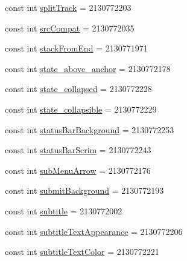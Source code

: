 \begin{DoxyCompactItemize}
\item 
const int \mbox{\hyperlink{class_f_w_p_s___app_1_1_droid_1_1_resource_1_1_attribute_aef4b9b833cbe81f054179859df3474b5}{split\+Track}} = 2130772203
\item 
const int \mbox{\hyperlink{class_f_w_p_s___app_1_1_droid_1_1_resource_1_1_attribute_a4768248c555a18bf40d06fd68fdbc4ea}{src\+Compat}} = 2130772035
\item 
const int \mbox{\hyperlink{class_f_w_p_s___app_1_1_droid_1_1_resource_1_1_attribute_a1e6408834e93d87ab324f1b93d15f7ae}{stack\+From\+End}} = 2130771971
\item 
const int \mbox{\hyperlink{class_f_w_p_s___app_1_1_droid_1_1_resource_1_1_attribute_a1a7566ecd97cb69d430450383849c219}{state\+\_\+above\+\_\+anchor}} = 2130772178
\item 
const int \mbox{\hyperlink{class_f_w_p_s___app_1_1_droid_1_1_resource_1_1_attribute_ac6df4bbbc19e50d5982d909b8423b6c2}{state\+\_\+collapsed}} = 2130772228
\item 
const int \mbox{\hyperlink{class_f_w_p_s___app_1_1_droid_1_1_resource_1_1_attribute_aef1b62a51094dcfe8aa05d500db9d944}{state\+\_\+collapsible}} = 2130772229
\item 
const int \mbox{\hyperlink{class_f_w_p_s___app_1_1_droid_1_1_resource_1_1_attribute_a4f9fce98bb828cea57be718bc0b5d36c}{status\+Bar\+Background}} = 2130772253
\item 
const int \mbox{\hyperlink{class_f_w_p_s___app_1_1_droid_1_1_resource_1_1_attribute_a2853386f4c6bb6add09b933d337f27f8}{status\+Bar\+Scrim}} = 2130772243
\item 
const int \mbox{\hyperlink{class_f_w_p_s___app_1_1_droid_1_1_resource_1_1_attribute_acf3e965098fd8242a628b761c2749a20}{sub\+Menu\+Arrow}} = 2130772176
\item 
const int \mbox{\hyperlink{class_f_w_p_s___app_1_1_droid_1_1_resource_1_1_attribute_a20dd6b19e5b4abe1e9023ca8a07a60ac}{submit\+Background}} = 2130772193
\item 
const int \mbox{\hyperlink{class_f_w_p_s___app_1_1_droid_1_1_resource_1_1_attribute_a86d318f797ebc74f761125e24d6a291e}{subtitle}} = 2130772002
\item 
const int \mbox{\hyperlink{class_f_w_p_s___app_1_1_droid_1_1_resource_1_1_attribute_ac4520589a2df595d120a5de860497521}{subtitle\+Text\+Appearance}} = 2130772206
\item 
const int \mbox{\hyperlink{class_f_w_p_s___app_1_1_droid_1_1_resource_1_1_attribute_a7f45a056b7cbb639ea289ae2d30c46f9}{subtitle\+Text\+Color}} = 2130772221

\end{DoxyCompactItemize}
